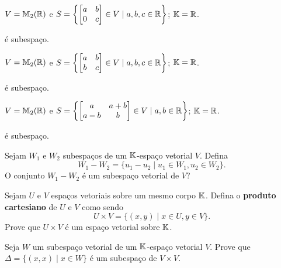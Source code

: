 \documentclass[12pt]{exam}
\begin{document}
\begin{exercicio}
  $V = \mathbb{M}_2(\mathbb{R})$ e $S = \left\{\begin{bmatrix} a & b\\ 0 & c\end{bmatrix} \in V \mid a, b, c \in \mathbb{R}\right\}$; $\mathbb{K} = \mathbb{R}$.
  \begin{solucao}
    é subespaço.
  \end{solucao}
\end{exercicio}

\begin{exercicio}
  $V = \mathbb{M}_2(\mathbb{R})$ e $S = \left\{\begin{bmatrix} a & b\\ b & c\end{bmatrix} \in V \mid a, b, c \in \mathbb{R}\right\}$; $\mathbb{K} = \mathbb{R}$.
  \begin{solucao}
    é subespaço.
  \end{solucao}
\end{exercicio}

\begin{exercicio}\label{subespacofim}
  $V = \mathbb{M}_2(\mathbb{R})$ e $S = \left\{\begin{bmatrix} a & a+b\\ a-b & b\end{bmatrix} \in V \mid a, b \in \mathbb{R} \right\}$; $\mathbb{K} = \mathbb{R}$.
  \begin{solucao}
    é subespaço.
  \end{solucao}
\end{exercicio}

\begin{exercicio}
  Sejam $W_1$ e $W_2$  subespaços de um $\mathbb{K}$-espaço vetorial $V$. Defina
  \[
  W_1 - W_2 = \{ u_1 - u_2 \mid u_1 \in W_1, u_2 \in W_2\}.
  \]
  O conjunto $W_1 - W_2$ é um subespaço vetorial de $V$?
\end{exercicio}

\begin{exercicio}
    Sejam $U$ e $V$ espaços vetoriais sobre um mesmo corpo $\mathbb{K}$. Defina o \textbf{produto cartesiano} de $U$ e $V$ como sendo
    \[
        U \times V = \{(x, y) \mid x \in U, y \in V\}.
    \]
    Prove que $U \times V$ é um espaço vetorial sobre $\mathbb{K}$.
\end{exercicio}

\begin{exercicio}
    Seja $W$ um subespaço vetorial de um $\mathbb{K}$-espaço vetorial $V$. Prove que $\Delta = \{(x, x) \mid x \in W\}$ é um subespaço de $V \times V$.
\end{exercicio}
\end{document}
